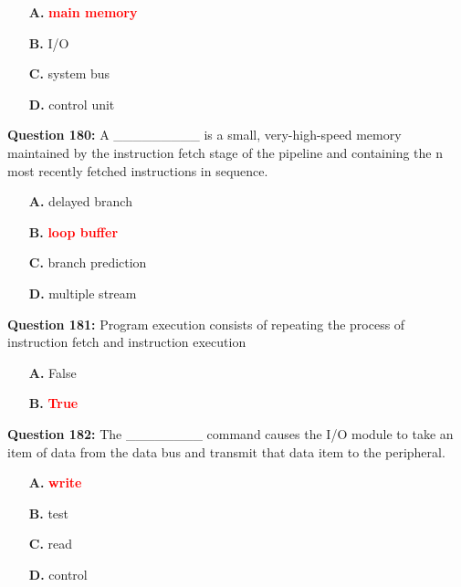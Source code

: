\documentclass[12pt,a4paper]{article}
\begin{document}
\begin{itemize}
    \item[\textbf{A.}] \textcolor{red}{\textbf{main memory}}
    \item[\textbf{B.}] I/O
    \item[\textbf{C.}] system bus
    \item[\textbf{D.}] control unit
\end{itemize}

\vspace{0.5cm}

\textbf{Question 180:} A _________ is a small, very-high-speed memory maintained by the instruction fetch stage of the pipeline and containing the n most recently fetched instructions in sequence.

\begin{itemize}
    \item[\textbf{A.}] delayed branch
    \item[\textbf{B.}] \textcolor{red}{\textbf{loop buffer}}
    \item[\textbf{C.}] branch prediction
    \item[\textbf{D.}] multiple stream
\end{itemize}

\vspace{0.5cm}

\textbf{Question 181:} Program execution consists of repeating the process of instruction fetch and instruction execution

\begin{itemize}
    \item[\textbf{A.}] False
    \item[\textbf{B.}] \textcolor{red}{\textbf{True}}
\end{itemize}

\vspace{0.5cm}

\textbf{Question 182:} The ________ command causes the I/O module to take an item of data from the data bus and transmit that data item to the peripheral.

\begin{itemize}
    \item[\textbf{A.}] \textcolor{red}{\textbf{write}}
    \item[\textbf{B.}] test
    \item[\textbf{C.}] read
    \item[\textbf{D.}] control
\end{itemize}
\end{document}
